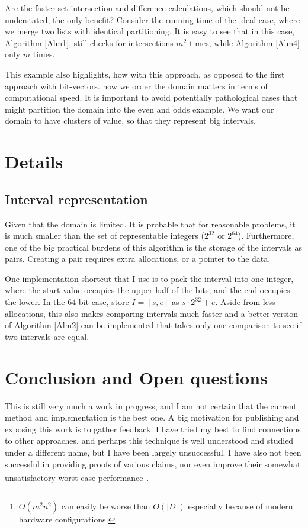 \documentclass{article}
\begin{document}
Are the faster set intersection and difference calculations,
which should not be understated,
the only benefit?
Consider the running time of the ideal case,
where we merge two lists with identical partitioning.
It is easy to see that in this case,
Algorithm \ref{Alm1},
still checks for intersections $m^{2}$ times,
while Algorithm \ref{Alm4} only $m$ times.

This example also highlights,
how with this approach,
as opposed to the first approach with bit-vectors.
how we order the domain matters in terms of computational speed.
It is important to avoid potentially pathological cases that might
partition the domain into the even and odds example.
We want our domain to have clusters of value,
so that they represent big intervals.

\section{Details}

\subsection{Interval representation}

Given that the domain is limited.
It is probable that for reasonable problems,
it is much smaller than the set of representable integers ($2^{32}$ or $2^64$).
Furthermore,
one of the big practical burdens of this algorithm is the storage of the intervals
as pairs.
Creating a pair requires extra allocations, or a pointer to the data.

One implementation shortcut that I use is to pack the interval into one integer,
where the start value occupies the upper half of the bits,
and the end occupies the lower.
In the 64-bit case, store $I = [s,e]$ as  $s \cdot 2^{32}+e$.
Aside from less allocations,
this also makes comparing intervals much faster
and a better version of Algorithm \ref{Alm2} can be implemented that
takes only one comparison to see if two intervals are equal.

\section{Conclusion and Open questions}

This is still very much a work in progress,
and I am not certain that the current method and implementation is the best one.
A big motivation for publishing and exposing this work is to gather feedback.
I have tried my best to find connections to other approaches,
and perhaps this technique is well understood and studied under a different name,
but I have been largely unsuccessful.
I have also not been successful in providing proofs of various claims,
nor even improve their somewhat unsatisfactory worst case
performance\footnote{$O(m^{2}n^{2})$ can easily be worse than $O(|D|)$ especially because
of modern hardware configurations.}.
\end{document}
